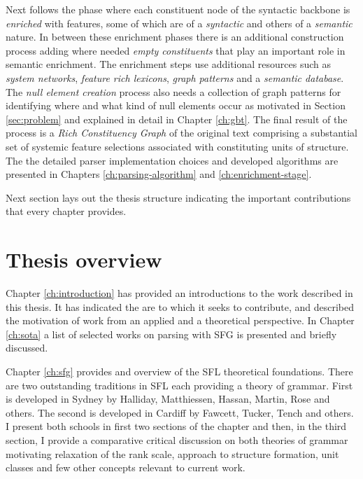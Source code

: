Next follows the phase where each constituent node of the syntactic backbone is \textit{enriched} with features, some of which are of a \textit{syntactic} and others of a \textit{semantic} nature. In between these enrichment phases there is an additional construction process adding where needed \textit{empty constituents} that play an important role in semantic enrichment. The enrichment steps use additional resources such as \textit{system networks}, \textit{feature rich lexicons}, \textit{graph patterns} and a \textit{semantic database}. The \textit{null element creation} process also needs a collection of graph patterns for identifying where and what kind of null elements occur as motivated in Section \ref{sec:problem} and explained in detail in Chapter \ref{ch:gbt}. The final result of the process is a \textit{Rich Constituency Graph} of the original text comprising a substantial set of systemic feature selections associated with constituting units of structure. 
The the detailed parser implementation choices and developed algorithms are presented in Chapters \ref{ch:parsing-algorithm} and \ref{ch:enrichment-stage}.

Next section lays out the thesis structure indicating the important contributions that every chapter provides.

\section{Thesis overview}
\label{sec:thesis-structure}

Chapter \ref{ch:introduction} has provided an introductions to the work described in this thesis. It has indicated the are to which it seeks to contribute, and described the motivation of work from an applied and a theoretical perspective. In Chapter \ref{ch:sota} a list of selected works on parsing with SFG is presented and briefly discussed. 

Chapter \ref{ch:sfg} provides and overview of the SFL theoretical foundations. There are two outstanding traditions in SFL each providing a theory of grammar. First is developed in Sydney by Halliday, Matthiessen, Hassan, Martin, Rose and others. The second is developed in Cardiff by Fawcett, Tucker, Tench and others. I present both schools in first two sections of the chapter and then, in the third section, I provide a comparative critical discussion on both theories of grammar motivating relaxation of the rank scale, approach to structure formation, unit classes and few other concepts relevant to current work. 

